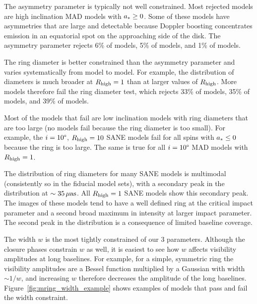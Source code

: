 The asymmetry parameter is typically not well constrained. Most rejected models are high inclination MAD models with $a_* \ge 0$.  Some of these models have asymmetries that are large and detectable because Doppler boosting concentrates emission in an equatorial spot on the approaching side of the disk.  The asymmetry parameter rejects 6\% of \kharma models, 5\% of \bhac models, and 1\% of \hamr models.  

The ring diameter is better constrained than the asymmetry parameter and varies systematically from model to model. For example, the distribution of diameters is much broader at $R_\mathrm{high} = 1$ than at larger values of $R_\mathrm{high}$.  More models therefore fail the ring diameter test, which rejects 33\% of \kharma models, 35\% of \bhac models, and 39\% of \hamr models.  

Most of the models that fail are low inclination models with ring diameters that are too large (no models fail because the ring diameter is too small).  For example, the $i = 10\degree$, $R_\mathrm{high} = 10$ SANE models fail for all spins with $a_* \le 0$ because the ring is too large.  The same is true for all $i = 10\degree$ MAD models with $R_\mathrm{high} = 1$.


The distribution of ring diameters for many SANE models is multimodal (consistently so in the fiducial model sets), with a secondary peak in the distribution at $\sim 35\,\mathrm{\mu as}$.  All $R_\mathrm{high} = 1$ SANE models show this secondary peak.  The images of these models tend to have a well defined ring at the critical impact parameter and a second broad maximum in intensity at larger impact parameter.  The second peak in the distribution is a consequence of limited baseline coverage.

The \mring width $w$ is the most tightly constrained of our 3 parameters. Although the closure phases constrain $w$ as well, it is easiest to see how $w$ affects visibility amplitudes at long baselines. For example, for a simple, symmetric ring the visibility amplitudes are a Bessel function multiplied by a Gaussian with width $\sim 1/w$, and increasing $w$ therefore decreases the amplitude of the long baselines.  Figure~\ref{fig:mring_width_example} shows examples of models that pass and fail the \mring width constraint. 

